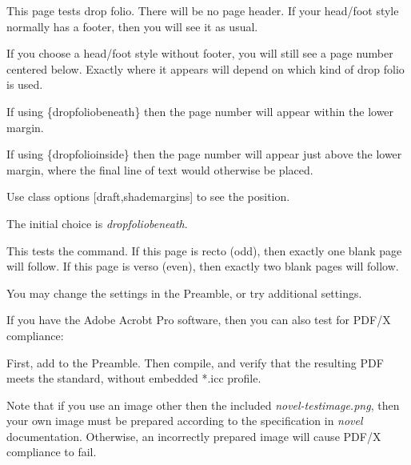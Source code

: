 \documentclass[test]{novel} %
\begin{document}
This page tests drop folio. There will be no page header. If your head/foot style normally has a footer, then you will see it as usual.

If you choose a head/foot style without footer, you will still see a page number centered below. Exactly where it appears will depend on which kind of drop folio is used.

If using \string\thispagestyle\{dropfoliobeneath\} then the page number will appear within the lower margin.

If using \string\thispagestyle\{dropfolioinside\} then the page number will appear just above the lower margin, where the final line of text would otherwise be placed. 

Use class options [draft,shademargins] to see the position.

The initial choice is \textit{dropfoliobeneath}.

\clearpage


This tests the \string\cleartoend\space command. If this page is recto (odd), then exactly one blank page will follow. If this page is verso (even), then exactly two blank pages will follow.

\null\null

You may change the settings in the Preamble, or try additional settings.

\null\null

If you have the Adobe Acrobt Pro software,  then you can also test for PDF/X compliance:

First, add  to the Preamble. Then compile, and verify that the resulting PDF meets the standard, without embedded *.icc profile.

Note that if you use an image other then the included \textit{novel-testimage.png}, then your own image must be prepared according to the specification in \textit{novel} documentation. Otherwise, an incorrectly prepared image will cause PDF/X compliance to fail.
\end{document}
